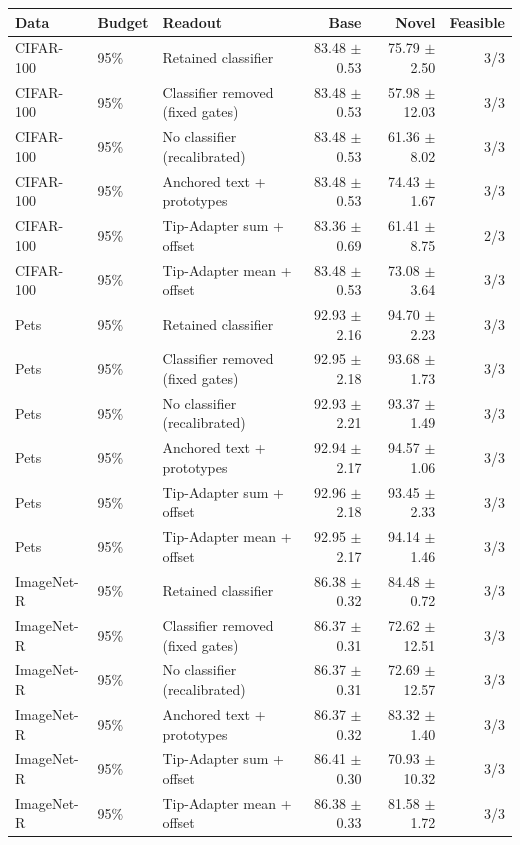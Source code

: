 \begin{tabular}{lllrrr}
\toprule
Data & Budget & Readout & Base & Novel & Feasible \\
\midrule
CIFAR-100 & 95\% & Retained classifier & 83.48 $\pm$ 0.53 & 75.79 $\pm$ 2.50 & 3/3 \\
CIFAR-100 & 95\% & Classifier removed (fixed gates) & 83.48 $\pm$ 0.53 & 57.98 $\pm$ 12.03 & 3/3 \\
CIFAR-100 & 95\% & No classifier (recalibrated) & 83.48 $\pm$ 0.53 & 61.36 $\pm$ 8.02 & 3/3 \\
CIFAR-100 & 95\% & Anchored text + prototypes & 83.48 $\pm$ 0.53 & 74.43 $\pm$ 1.67 & 3/3 \\
CIFAR-100 & 95\% & Tip-Adapter sum + offset & 83.36 $\pm$ 0.69 & 61.41 $\pm$ 8.75 & 2/3 \\
CIFAR-100 & 95\% & Tip-Adapter mean + offset & 83.48 $\pm$ 0.53 & 73.08 $\pm$ 3.64 & 3/3 \\
\midrule
Pets & 95\% & Retained classifier & 92.93 $\pm$ 2.16 & 94.70 $\pm$ 2.23 & 3/3 \\
Pets & 95\% & Classifier removed (fixed gates) & 92.95 $\pm$ 2.18 & 93.68 $\pm$ 1.73 & 3/3 \\
Pets & 95\% & No classifier (recalibrated) & 92.93 $\pm$ 2.21 & 93.37 $\pm$ 1.49 & 3/3 \\
Pets & 95\% & Anchored text + prototypes & 92.94 $\pm$ 2.17 & 94.57 $\pm$ 1.06 & 3/3 \\
Pets & 95\% & Tip-Adapter sum + offset & 92.96 $\pm$ 2.18 & 93.45 $\pm$ 2.33 & 3/3 \\
Pets & 95\% & Tip-Adapter mean + offset & 92.95 $\pm$ 2.17 & 94.14 $\pm$ 1.46 & 3/3 \\
\midrule
ImageNet-R & 95\% & Retained classifier & 86.38 $\pm$ 0.32 & 84.48 $\pm$ 0.72 & 3/3 \\
ImageNet-R & 95\% & Classifier removed (fixed gates) & 86.37 $\pm$ 0.31 & 72.62 $\pm$ 12.51 & 3/3 \\
ImageNet-R & 95\% & No classifier (recalibrated) & 86.37 $\pm$ 0.31 & 72.69 $\pm$ 12.57 & 3/3 \\
ImageNet-R & 95\% & Anchored text + prototypes & 86.37 $\pm$ 0.32 & 83.32 $\pm$ 1.40 & 3/3 \\
ImageNet-R & 95\% & Tip-Adapter sum + offset & 86.41 $\pm$ 0.30 & 70.93 $\pm$ 10.32 & 3/3 \\
ImageNet-R & 95\% & Tip-Adapter mean + offset & 86.38 $\pm$ 0.33 & 81.58 $\pm$ 1.72 & 3/3 \\
\bottomrule
\end{tabular}
